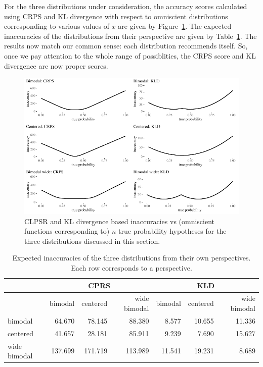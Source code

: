 \documentclass[
  letterpaper,
  DIV=11,
  numbers=noendperiod]{scrartcl}
\begin{document}
For the three distributions under consideration, the accuracy scores
calculated using CRPS and KL divergence with respect to omniscient
distributions corresponding to various values of \(x\) are given by
Figure~\ref{fig-inaccuracies2}. The expected inaccuracies of the
distributions from their perspective are given by
\mbox{Table \ref{tbl:expected2}.} The results now match our common
sense: each distribution recommends itself. So, once we pay attention to
the whole range of possiblities, the CRPS score and KL divergence are
now proper scores.

\begin{figure}[H]

{\centering \includegraphics[width=1\textwidth,height=\textheight]{imp_philosophical_files/figure-pdf/fig-inaccuracies2-1.pdf}

}

\caption{\label{fig-inaccuracies2}CLPSR and KL divergence based
inaccuracies vs (omniscient functions corresponding to) \(n\) true
probability hypotheses for the three distributions discussed in this
section.}

\end{figure}

\begin{table}[H]
\begin{tabular}{lrrrrrr}
& \multicolumn{3}{c}{CPRS} & \multicolumn{3}{c}{KLD} \\
\toprule
  & bimodal & centered & wide bimodal & bimodal & centered & wide bimodal\\
\midrule
bimodal & 64.670 & 78.145 & 88.380 & 8.577 & 10.655 & 11.336\\
centered & 41.657 & 28.181 & 85.911 & 9.239 & 7.690 & 15.627\\
wide bimodal & 137.699 & 171.719 & 113.989 & 11.541 & 19.231 & 8.689\\
\bottomrule
\end{tabular}
\caption{Expected inaccuracies of the three distributions from their own perspectives.
 Each row corresponds to a perspective.}
\label{tbl:expected2}
\end{table}
\end{document}
